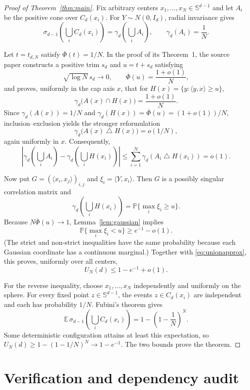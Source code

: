 \documentclass[11pt]{article}
\newcommand{\Sph}{\mathbb S}
\newcommand{\PP}{\mathbb P}
\newcommand{\EE}{\mathbb E}
\newcommand{\gauss}{\gamma_d}
\newcommand{\phibar}{\overline\Phi}
\begin{document}
\begin{proof}[Proof of Theorem~\ref{thm:main}]
Fix arbitrary centers $x_1,\ldots,x_N\in\Sph^{d-1}$ and let $A_i$ be the
positive cone over $C_d(x_i)$.  For $Y\sim N(0,I_d)$, radial invariance gives
\[
 \sigma_{d-1}\!\left(\bigcup_iC_d(x_i)\right)
 =\gauss\!\left(\bigcup_iA_i\right),
 \qquad \gauss(A_i)=\frac1N.
\]

Let $t=t_{d,N}$ satisfy $\phibar(t)=1/N$.  In the proof of its Theorem~1,
the source paper constructs a positive trim $s_d$ and $u=t+s_d$ satisfying
\[
 \sqrt{\log N}\,s_d\to0,
 \qquad
 \phibar(u)=\frac{1+o(1)}N,
\]
and proves, uniformly in the cap axis $x$, that for
$H(x)=\{y:\langle y,x\rangle\ge u\}$,
\[
 \gauss\bigl(A(x)\cap H(x)\bigr)=\frac{1+o(1)}N.
\]
Since $\gauss(A(x))=1/N$ and
$\gauss(H(x))=\phibar(u)=(1+o(1))/N$, inclusion--exclusion yields the
stronger reformulation
\[
 \gauss\bigl(A(x)\mathbin\triangle H(x)\bigr)=o(1/N),
\]
again uniformly in $x$.  Consequently,
\begin{equation}\label{eq:unionapprox}
 \left|\gauss\!\left(\bigcup_iA_i\right)
 -\gauss\!\left(\bigcup_iH(x_i)\right)\right|
 \le\sum_{i=1}^N\gauss(A_i\mathbin\triangle H(x_i))=o(1).
\end{equation}

Now put $G=(\langle x_i,x_j\rangle)_{i,j}$ and
$\xi_i=\langle Y,x_i\rangle$.  Then $G$ is a possibly singular correlation
matrix and
\[
 \gauss\!\left(\bigcup_iH(x_i)\right)
 =\PP\{\max_i\xi_i\ge u\}.
\]
Because $N\phibar(u)\to1$, Lemma~\ref{lem:gaussian} implies
\[
 \PP\{\max_i\xi_i<u\}\ge e^{-1}-o(1).
\]
(The strict and non-strict inequalities have the same probability because
each Gaussian coordinate has a continuous marginal.)
Together with \eqref{eq:unionapprox}, this proves, uniformly over all centers,
\[
 U_N(d)\le1-e^{-1}+o(1).
\]

For the reverse inequality, choose $x_1,\ldots,x_N$ independently and
uniformly on the sphere.  For every fixed point $z\in\Sph^{d-1}$, the events
$z\in C_d(x_i)$ are independent and each has probability $1/N$.  Fubini's
theorem gives
\[
 \EE\,\sigma_{d-1}\!\left(\bigcup_iC_d(x_i)\right)
 =1-\left(1-\frac1N\right)^N.
\]
Some deterministic configuration attains at least this expectation, so
$U_N(d)\ge1-(1-1/N)^N\to1-e^{-1}$.  The two bounds prove the theorem.
\end{proof}

\section{Verification and dependency audit}
\end{document}
